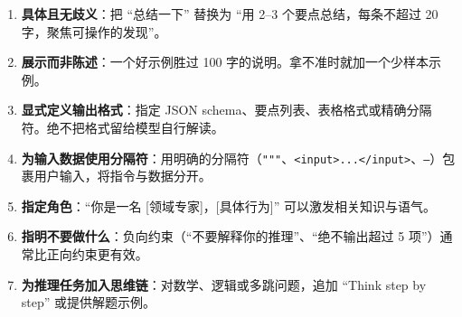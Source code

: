 \begin{keybox}
\begin{enumerate}
  \item \textbf{具体且无歧义}：把 ``总结一下'' 替换为 ``用 2--3 个要点总结，每条不超过 20 字，聚焦可操作的发现''。
  \item \textbf{展示而非陈述}：一个好示例胜过 100 字的说明。拿不准时就加一个少样本示例。
  \item \textbf{显式定义输出格式}：指定 JSON schema、要点列表、表格格式或精确分隔符。绝不把格式留给模型自行解读。
  \item \textbf{为输入数据使用分隔符}：用明确的分隔符（\texttt{"""}、\texttt{<input>...</input>}、\texttt{---}）包裹用户输入，将指令与数据分开。
  \item \textbf{指定角色}：``你是一名 [领域专家]，[具体行为]'' 可以激发相关知识与语气。
  \item \textbf{指明不要做什么}：负向约束（``不要解释你的推理''、``绝不输出超过 5 项''）通常比正向约束更有效。
  \item \textbf{为推理任务加入思维链}：对数学、逻辑或多跳问题，追加 ``Think step by step'' 或提供解题示例。

\end{enumerate}
\end{keybox}
